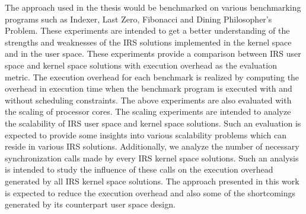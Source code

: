 The approach used in the thesis would be benchmarked on various benchmarking programs such as Indexer, Last Zero, Fibonacci and Dining Philosopher's Problem. 
These experiments are intended to get a better understanding of the strengths and weaknesses of the IRS solutions implemented in the kernel space and in the user space. 
These experiments provide a comparison between IRS user space and kernel space solutions with execution overhead as the evaluation metric. 
The execution overhead for each benchmark is realized by computing the overhead in execution time when the benchmark program is executed with and without scheduling constraints. 
The above experiments are also evaluated with the scaling of processor cores. 
The scaling experiments are intended to analyze the scalability of IRS user space and kernel space solutions. 
Such an evaluation is expected to provide some insights into various scalability problems which can reside in various IRS solutions. 
Additionally, we analyze the number of necessary synchronization calls made by every IRS kernel space solutions. 
Such an analysis is intended to study the influence of these calls on the execution overhead generated by all IRS kernel space solutions. 
The approach presented in this work is expected to reduce the execution overhead and also some of the shortcomings generated by its counterpart user space design. 